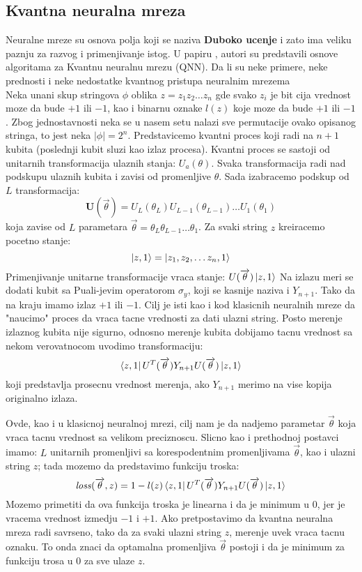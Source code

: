 \documentclass[12pt, letterpaper, oneside]{article}
\begin{document}
\subsection{Kvantna neuralna mreza}
Neuralne mreze su osnova polja koji se naziva \textbf{Duboko ucenje} i zato ima veliku paznju za razvog i primenjivanje istog.
U papiru \cite{Classification_wit_QNN}, autori su predstavili osnove algoritama za Kvantnu neuralnu mrezu (QNN).
Da li su neke primere, neke prednosti i neke nedostatke kvantnog pristupa neuralnim mrezema\\

Neka unani skup stringova $\phi$ oblika $z=z_1 z_2 \dots z_n$ gde svako $z_i$ je bit cija vrednost moze da bude $+1$ ili $-1$,
kao i binarnu oznake $l(z)$ koje moze da bude $+1$ ili $-1$. Zbog jednostavnosti neka se u nasem setu nalazi sve permutacije 
ovako opisanog stringa, to jest neka $|\phi|=2^n$.
Predstavicemo kvantni proces koji radi na $n+1$ kubita (poslednji kubit sluzi kao izlaz procesa). Kvantni proces se sastoji od 
unitarnih transformacija ulaznih stanja: ${U_a(\theta)}$.
Svaka transformacija radi nad podskupu ulaznih kubita i zavisi od promenljive $\theta$.
Sada izabracemo podskup od $L$ transformacija:
\[
  \mathbf{U}(\overrightarrow{\theta}) = U_{L}(\theta_{L}) U_{L-1}(\theta_{L-1}) \dots U_{1}(\theta_{1}) 
\]
koja zavise od $L$ parametara $\overrightarrow{\theta}=\theta_{L} \theta_{L-1} \dots \theta_{1}$.
Za svaki string $z$ kreiracemo pocetno stanje:
\[
    \Ket{z,1} = \Ket{z_1, z_2, \dots z_n, 1}
\]
Primenjivanje unitarne transformacije vraca stanje: $U(\overrightarrow{\theta})\Ket{z,1}$
Na izlazu meri se dodati kubit sa Puali-jevim operatorom $\sigma_y$, koji se kasnije naziva i $Y_{n+1}$.
Tako da na kraju imamo izlaz $+1$ ili $-1$. Cilj je isti kao i kod klasicnih neuralnih mreze da "naucimo" proces da vraca
tacne vrednosti za dati ulazni string. Posto merenje izlaznog kubita nije sigurno, odnosno merenje kubita dobijamo tacnu vrednost 
sa nekom verovatnocom uvodimo transformaciju:
\[
    \bra{z,1}U^T(\overrightarrow{\theta})Y_{n+1}U(\overrightarrow{\theta})\Ket{z,1}
\]
koji predstavlja prosecnu vrednost merenja, ako $Y_{n+1}$ merimo na vise kopija originalno izlaza. 

Ovde, kao i u klasicnoj neuralnoj mrezi, cilj nam je da nadjemo parametar $\overrightarrow{\theta}$ koja vraca tacnu vrednost sa velikom preciznoscu.
Slicno kao i prethodnoj postavci imamo: $L$ unitarnih promenljivi sa korespodentnim promenljivama $\overrightarrow{\theta}$, kao i ulazni string $z$; 
tada mozemo da predstavimo funkciju troska:
\[
    \mathit{loss}(\overrightarrow{\theta},z) = 1 - l(z)\bra{z,1}U^T(\overrightarrow{\theta})Y_{n+1}U(\overrightarrow{\theta})\Ket{z,1}
\]
Mozemo primetiti da ova funkcija troska je linearna i da je minimum u $0$, jer je vracema vrednost izmedju $-1$ i $+1$.
Ako pretpostavimo da kvantna neuralna mreza radi savrseno, tako da za svaki ulazni string $z$, merenje uvek vraca tacnu oznaku.
To onda znaci da optamalna promenljiva $\overrightarrow{\theta}$ postoji i da je minimum za funkciju trosa u $0$ za sve ulaze $z$.



\newpage
\printbibliography
\end{document}
